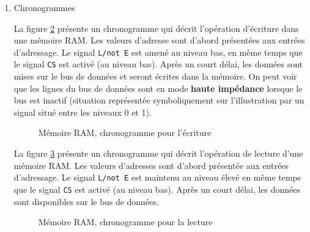 \documentclass[letter, oneside]{book}
\begin{document}
\begin{enumerate}
Pour acheminer les données lues ou à écrire dans la mémoire, on
utilise des tampons émetteurs-récepteurs de bus (voir section \ref{sec:org1fde717}), organisés en vecteur, pour créer un
\textbf{bus de données} qui permet un aller-retour des données, selon le sens
de l'action. Cela permet de diminuer de moitié le nombre de connexions
nécessaires pour l'échange des données.  Un signal dérivé des signaux
\texttt{Lecture/écriture} et \texttt{Chip select (CS)} est typiquement utilisé pour
commander l'entrée de contrôle (voir figure \ref{fig:org97eb0ad}).

\begin{figure}[htbp]
\centering

\caption{\label{fig:org97eb0ad}Bus de données, 8 bits}
\end{figure}

\item Chronogrammes
\label{sec:org490832e}

La figure \ref{fig:orgfe0f271} présente un chronogramme qui décrit
l'opération d'écriture dans une mémoire RAM. Les valeurs d'adresse
sont d'abord présentées aux entrées d'adressage.  Le signal \texttt{L/not E}
est amené au niveau bas, en même temps que le signal \texttt{CS} est activé
(au niveau bas). Après un court délai, les données sont mises sur le
bus de données et seront écrites dans la mémoire. On peut voir que les
lignes du bus de données sont en mode \textbf{haute impédance} lorsque le bus
est inactif (situation représentée symboliquement sur l'illustration
par un signal situé entre les niveaux 0 et 1).

\begin{figure}[htbp]
\centering

\caption{\label{fig:orgfe0f271}Mémoire RAM, chronogramme pour l'écriture}
\end{figure}

La figure \ref{fig:org8e2c464} présente un chronogramme qui décrit
l'opération de lecture d'une mémoire RAM. Les valeurs d'adresses sont
d'abord présentée aux entrées d'adressage.  Le signal \texttt{L/not E} est
maintenu au niveau élevé en même temps que le signal \texttt{CS} est activé
(au niveau bas). Après un court délai, les données sont disponibles sur
le bus de données.

\begin{figure}[htbp]
\centering

\caption{\label{fig:org8e2c464}Mémoire RAM, chronogramme pour la lecture}
\end{figure}


\end{enumerate}
\end{document}
